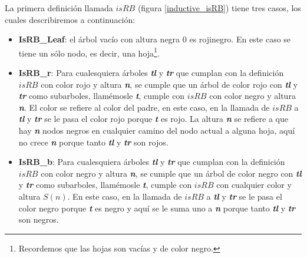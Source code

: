 La primera definici\'on llamada \hyperref[inductive_isRB]{$isRB$} (figura \ref{inductive_isRB}) 
tiene tres casos, los cuales describiremos a continuaci\'on:
\begin{itemize}
        \item \textbf{IsRB\_Leaf}: el árbol vacío con altura negra 0 es rojinegro. En este caso
        se tiene un s\'olo nodo, es decir, una hoja\footnote{Recordemos que las hojas son vac\'ias y de
        color negro.}.
        \item \textbf{IsRB\_r}: Para cualesquiera \'arboles \textbf{\textit{tl}} y 
        \textbf{\textit{tr}} que cumplan con la definici\'on \hyperref[inductive_isRB]{$isRB$} con 
        color rojo y altura \textbf{\textit{n}}, se cumple que un \'arbol de color rojo con 
        \textbf{\textit{tl}} y \textbf{\textit{tr}} como subarboles, llam\'emosle \textbf{\textit{t}}, cumple 
        con \hyperref[inductive_isRB]{$isRB$} con color negro y altura \textbf{\textit{n}}. El color 
        se refiere al color del padre, en este caso, en la llamada de 
        \hyperref[inductive_isRB]{$isRB$} a \textbf{\textit{tl}} y \textbf{\textit{tr}} se le pasa 
        el color rojo porque \textbf{\textit{t}} es rojo. La altura \textbf{\textit{n}} se refiere a 
        que hay \textbf{\textit{n}} nodos negros en cualquier camino del nodo actual a alguna hoja, 
        aqu\'i no crece \textbf{\textit{n}} porque tanto
        \textbf{\textit{tl}} y \textbf{\textit{tr}} son rojos.
        \item \textbf{IsRB\_b}: Para cualesquiera \'arboles \textbf{\textit{tl}} y 
        \textbf{\textit{tr}} que cumplan con la definici\'on \hyperref[inductive_isRB]{$isRB$} con 
        color negro y altura \textbf{\textit{n}}, se cumple que un \'arbol de color negro con 
        \textbf{\textit{tl}} y \textbf{\textit{tr}} como subarboles, llam\'emosle \textbf{\textit{t}}, cumple 
        con \hyperref[inductive_isRB]{$isRB$} con cualquier color y altura $S(n)$. En este caso, en 
        la llamada de \hyperref[inductive_isRB]{$isRB$} a \textbf{\textit{tl}} y 
        \textbf{\textit{tr}} se le pasa el color negro porque \textbf{\textit{t}} es negro y aqu\'i se 
        le suma uno a \textbf{\textit{n}} porque tanto \textbf{\textit{tl}} y \textbf{\textit{tr}} 
        son negros.
\end{itemize}

